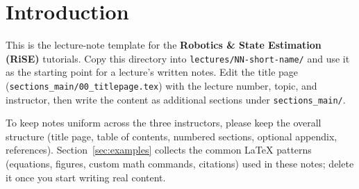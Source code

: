 \section{Introduction} \label{sec:intro}

This is the lecture-note template for the \textbf{Robotics \& State Estimation (RiSE)} tutorials.
Copy this directory into \texttt{lectures/NN-short-name/} and use it as the starting point for a
lecture's written notes. Edit the title page (\texttt{sections\_main/00\_titlepage.tex}) with the
lecture number, topic, and instructor, then write the content as additional sections under
\texttt{sections\_main/}.

To keep notes uniform across the three instructors, please keep the overall structure (title page,
table of contents, numbered sections, optional appendix, references). Section~\ref{sec:examples}
collects the common \LaTeX{} patterns (equations, figures, custom math commands, citations) used in
these notes; delete it once you start writing real content.
